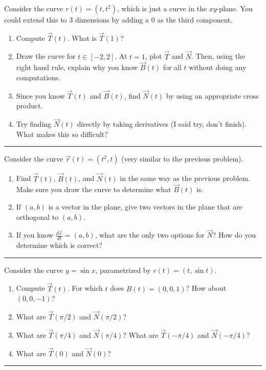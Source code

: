 \begin{problem}
 Consider the curve $r(t)=(t,t^2)$, which is just a curve in the $xy$-plane. You could extend this to 3 dimensions by adding a 0 as the third component.  
\begin{enumerate}
 \item Compute $\vec T(t)$.  What is $\vec T(1)$?
 \item Draw the curve for $t\in[-2,2]$.  At $t=1$, plot $\vec T$ and $\vec N$. Then, using the right hand rule, explain why you know $\vec B(t)$ for all $t$ without doing any computations.
 \item Since you know $\vec T(t)$ and $\vec B(t)$, find $\vec N(t)$ by using an appropriate cross product.
 \item Try finding $\vec N(t)$ directly by taking derivatives (I said try, don't finish).  What makes this so difficult?
\end{enumerate}
\hrule\end{problem}

\begin{problem}
 Consider the curve $\vec r(t)=(t^2,t)$ (very similar to the previous problem).
\begin{enumerate}
 \item Find $\vec T(t)$, $\vec B(t)$, and $\vec N(t)$ in the same way as the previous problem. Make sure you draw the curve to determine what $\vec B(t)$ is.
 \item If $(a,b)$ is a vector in the plane, give two vectors in the plane that are orthogonal to $(a,b)$.
 \item If you know $\frac{d\vec r}{dt}=(a,b)$, what are the only two options for $\vec N$?  How do you determine which is correct?
\end{enumerate}
\hrule\end{problem}

\begin{problem}
 Consider the curve $y=\sin x$, parametrized by $r(t)=(t,\sin t)$. 
\begin{enumerate}
 \item Compute $\vec T(t)$. For which $t$ does $B(t)=(0,0,1)$? How about $(0,0,-1)$?
 \item What are $\vec T(\pi/2)$ and $\vec N(\pi/2)$?
 \item What are $\vec T(\pi/4)$ and $\vec N(\pi/4)$? What are $\vec T(-\pi/4)$ and $\vec N(-\pi/4)$?
 \item What are $\vec T(0)$ and $\vec N(0)$?
\end{enumerate}
\hrule\end{problem}




